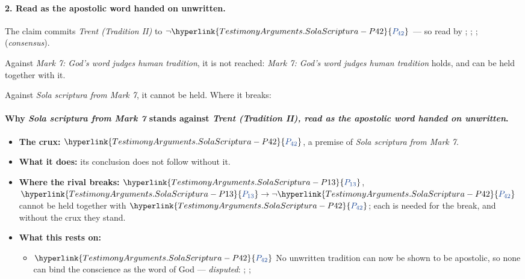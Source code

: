 \documentclass[11pt]{article}
\newcommand{\pvar}[2]{\hyperlink{#1-P#2}{\textcolor{claimlink}{P_{#2}}}}
\begin{document}
\paragraph{2. Read as the apostolic word handed on unwritten.} The claim commits \emph{Trent (Tradition II)} to \(\lnot \pvar{TestimonyArguments.SolaScriptura}{42}\) --- so read by \cite[18]{waterworth-trent-1848}; \cite[Trent, Session IV (1546), Decree on Sacred Books and Traditions]{tanner-decrees-1990}; \cite[Vatican II (1965), Dei Verbum 9]{tanner-decrees-1990}; \cite[83]{catholic-church-catechism-2000} (\emph{consensus}).

Against \emph{Mark 7: God’s word judges human tradition}, it is not reached: \emph{Mark 7: God’s word judges human tradition} holds, and can be held together with it.

Against \emph{Sola scriptura from Mark 7}, it cannot be held. Where it breaks:
\paragraph{Why \emph{Sola scriptura from Mark 7} stands against \emph{Trent (Tradition II), read as the apostolic word handed on unwritten}.}
\begin{itemize}
\item \textbf{The crux:} \(\pvar{TestimonyArguments.SolaScriptura}{42}\), a premise of \emph{Sola scriptura from Mark 7}.
\item \textbf{What it does:} its conclusion does not follow without it.
\item \textbf{Where the rival breaks:} \(\pvar{TestimonyArguments.SolaScriptura}{13}\), \(\pvar{TestimonyArguments.SolaScriptura}{13} \rightarrow \lnot \pvar{TestimonyArguments.SolaScriptura}{42}\) cannot be held together with \(\pvar{TestimonyArguments.SolaScriptura}{42}\); each is needed for the break, and without the crux they stand.
\item \textbf{What this rests on:}
\begin{itemize}
\item \(\pvar{TestimonyArguments.SolaScriptura}{42}\) No unwritten tradition can now be shown to be apostolic, so none can bind the conscience as the word of God --- \emph{disputed}: \cite[503--511]{whitaker-disputation-1849}; \cite[594]{whitaker-disputation-1849}; \cite[I.6]{westminster-confession-1647}
\end{itemize}
\end{itemize}
\end{document}

